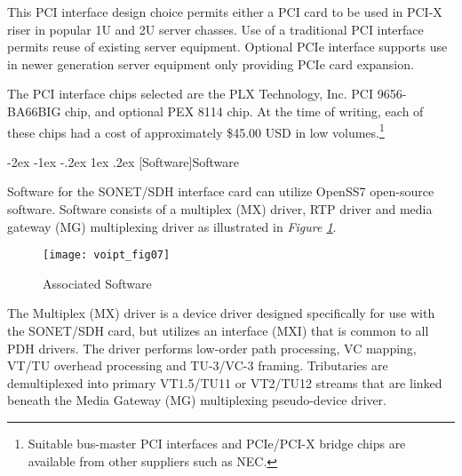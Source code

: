 \documentclass[letterpaper,final,notitlepage,twocolumn,10pt,twoside]{article}
\makeatletter
\renewcommand\section{\@startsection {section}{1}{\z@}%
                                   {-2ex \@plus -1ex \@minus -.2ex}%
                                   {1ex \@plus .2ex}%
                                   {\normalfont\large\bfseries}}
\renewcommand\subsection{\@startsection{subsection}{2}{\z@}%
                                     {-1.5ex \@plus -.5ex \@minus -.2ex}%
                                     {1ex \@plus .2ex}%
                                     {\normalfont\normalsize\bfseries}}
\renewcommand\paragraph{\@startsection{paragraph}{4}{\z@}%
                                    {1.5ex \@plus .5ex \@minus .2ex}%
                                    {-1em}%
                                    {\normalfont\normalsize\bfseries\slshape}}
\makeatother
\begin{document}
This PCI interface design choice permits either a PCI card to be used in PCI-X
riser in popular 1U and 2U server chasses.  Use of a traditional PCI interface
permits reuse of existing server equipment.  Optional PCIe interface supports
use in newer generation server equipment only providing PCIe card expansion.

The PCI interface chips selected are the PLX Technology, Inc. PCI 9656-BA66BIG
chip, and optional PEX 8114 chip.  At the time of writing, each of these chips
had a cost of approximately \$45.00 USD in low volumes.\footnote{Suitable
bus-master PCI interfaces and PCIe/PCI-X bridge chips are available from other
suppliers such as NEC.}

% 

\section[Software]{Software}

Software for the SONET/SDH interface card can utilize OpenSS7 open-source
software. Software consists of a multiplex (MX) driver, RTP driver and media
gateway (MG) multiplexing driver as illustrated in \textsl{Figure
\ref{figure:voipt_fig07}}.
\begin{figure}[htp]
\center\texttt{[image: voipt\_fig07]}
\caption[Software]{Associated Software}
\label{figure:voipt_fig07}
\end{figure}

The Multiplex (MX) driver is a device driver designed specifically for use with
the SONET/SDH card, but utilizes an interface (MXI) that is common to all PDH
drivers.  The driver performs low-order path processing, VC mapping, VT/TU
overhead processing and TU-3/VC-3 framing.  Tributaries are demultiplexed into
primary VT1.5/TU11 or VT2/TU12 streams that are linked beneath the Media Gateway
(MG) multiplexing pseudo-device driver.
\end{document}
